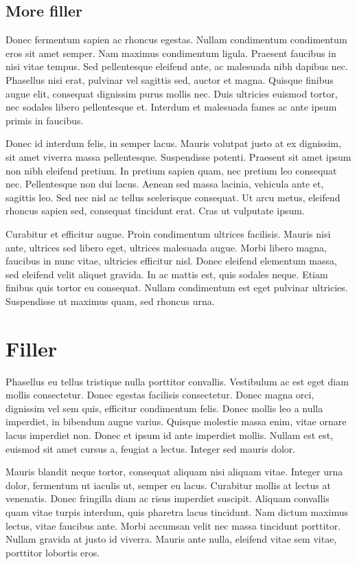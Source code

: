 \subsection{More filler}
Donec fermentum sapien ac rhoncus egestas. Nullam condimentum condimentum eros sit amet semper. Nam maximus condimentum ligula. Praesent faucibus in nisi vitae tempus. Sed pellentesque eleifend ante, ac malesuada nibh dapibus nec. Phasellus nisi erat, pulvinar vel sagittis sed, auctor et magna. Quisque finibus augue elit, consequat dignissim purus mollis nec. Duis ultricies euismod tortor, nec sodales libero pellentesque et. Interdum et malesuada fames ac ante ipsum primis in faucibus.

Donec id interdum felis, in semper lacus. Mauris volutpat justo at ex dignissim, sit amet viverra massa pellentesque. Suspendisse potenti. Praesent sit amet ipsum non nibh eleifend pretium. In pretium sapien quam, nec pretium leo consequat nec. Pellentesque non dui lacus. Aenean sed massa lacinia, vehicula ante et, sagittis leo. Sed nec nisl ac tellus scelerisque consequat. Ut arcu metus, eleifend rhoncus sapien sed, consequat tincidunt erat. Cras ut vulputate ipsum.

Curabitur et efficitur augue. Proin condimentum ultrices facilisis. Mauris nisi ante, ultrices sed libero eget, ultrices malesuada augue. Morbi libero magna, faucibus in nunc vitae, ultricies efficitur nisl. Donec eleifend elementum massa, sed eleifend velit aliquet gravida. In ac mattis est, quis sodales neque. Etiam finibus quis tortor eu consequat. Nullam condimentum est eget pulvinar ultricies. Suspendisse ut maximus quam, sed rhoncus urna.

\section{Filler}
Phasellus eu tellus tristique nulla porttitor convallis. Vestibulum ac est eget diam mollis consectetur. Donec egestas facilisis consectetur. Donec magna orci, dignissim vel sem quis, efficitur condimentum felis. Donec mollis leo a nulla imperdiet, in bibendum augue varius. Quisque molestie massa enim, vitae ornare lacus imperdiet non. Donec et ipsum id ante imperdiet mollis. Nullam est est, euismod sit amet cursus a, feugiat a lectus. Integer sed mauris dolor.

Mauris blandit neque tortor, consequat aliquam nisi aliquam vitae. Integer urna dolor, fermentum ut iaculis ut, semper eu lacus. Curabitur mollis at lectus at venenatis. Donec fringilla diam ac risus imperdiet suscipit. Aliquam convallis quam vitae turpis interdum, quis pharetra lacus tincidunt. Nam dictum maximus lectus, vitae faucibus ante. Morbi accumsan velit nec massa tincidunt porttitor. Nullam gravida at justo id viverra. Mauris ante nulla, eleifend vitae sem vitae, porttitor lobortis eros.

